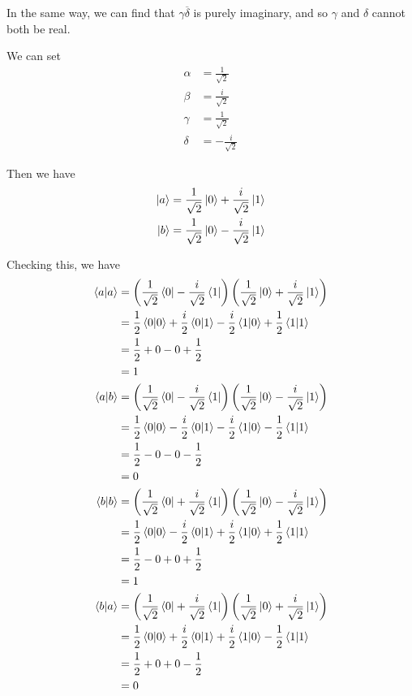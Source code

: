 \documentclass[12pt]{extarticle}
\begin{document}
In the same way, we can find that $\gamma\overline{\delta}$ is purely imaginary,
and so $\gamma$ and $\delta$ cannot both be real.

We can set
\begin{align*}
\alpha & = \frac{1}{\sqrt{2}} \\
\beta & = \frac{i}{\sqrt{2}} \\
\gamma & = \frac{1}{\sqrt{2}} \\
\delta & = -\frac{i}{\sqrt{2}}
\end{align*}

Then we have
\begin{align*}
\ket{a} & = \frac{1}{\sqrt{2}}\ket{0} + \frac{i}{\sqrt{2}}\ket{1} \\
\ket{b} & = \frac{1}{\sqrt{2}}\ket{0} - \frac{i}{\sqrt{2}}\ket{1}
\end{align*}

Checking this, we have
\begin{align*}
\innerproduct{a}{a} & = \left(\istwo\bra{0} - \frac{i}{\sqrt{2}}\bra{1}\right) \left(\istwo\ket{0} + \frac{i}{\sqrt{2}}\ket{1}\right) \\
& = \frac{1}{2}\innerproduct{0}{0} + \frac{i}{2}\innerproduct{0}{1} - \frac{i}{2}\innerproduct{1}{0} + \frac{1}{2}\innerproduct{1}{1} \\
& = \frac{1}{2} + 0 - 0 + \frac{1}{2} \\
& = 1 \\
\innerproduct{a}{b} & = \left(\istwo\bra{0} - \frac{i}{\sqrt{2}}\bra{1}\right) \left(\istwo\ket{0} - \frac{i}{\sqrt{2}}\ket{1}\right) \\
& = \frac{1}{2}\innerproduct{0}{0} - \frac{i}{2}\innerproduct{0}{1} - \frac{i}{2}\innerproduct{1}{0} - \frac{1}{2}\innerproduct{1}{1} \\
& = \frac{1}{2} - 0 - 0 - \frac{1}{2} \\
& = 0 \\
\innerproduct{b}{b} & = \left(\istwo\bra{0} + \frac{i}{\sqrt{2}}\bra{1}\right) \left(\istwo\ket{0} - \frac{i}{\sqrt{2}}\ket{1}\right) \\
& = \frac{1}{2}\innerproduct{0}{0} - \frac{i}{2}\innerproduct{0}{1} + \frac{i}{2}\innerproduct{1}{0} + \frac{1}{2}\innerproduct{1}{1} \\
& = \frac{1}{2} - 0 + 0 + \frac{1}{2} \\
& = 1 \\
\innerproduct{b}{a} & = \left(\istwo\bra{0} + \frac{i}{\sqrt{2}}\bra{1}\right) \left(\istwo\ket{0} + \frac{i}{\sqrt{2}}\ket{1}\right) \\
& = \frac{1}{2}\innerproduct{0}{0} + \frac{i}{2}\innerproduct{0}{1} + \frac{i}{2}\innerproduct{1}{0} - \frac{1}{2}\innerproduct{1}{1} \\
& = \frac{1}{2} + 0 + 0 - \frac{1}{2} \\
& = 0
\end{align*}
\end{document}
